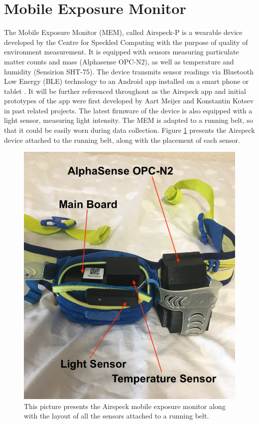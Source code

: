 \documentclass[bsc,frontabs,twoside,singlespacing, parskip,deptreport]{infthesis}     %
\begin{document}
\section{Mobile Exposure Monitor}

The Mobile Exposure Monitor (MEM), called Airspeck-P is a wearable device developed by the Centre for Speckled Computing with the purpose of quality of environment measurement. It is equipped with sensors measuring particulate matter counts and mass (Alphasense OPC-N2), as well as temperature and humidity (Sensirion SHT-75). The device transmits sensor readings via Bluetooth Low Energy (BLE) technology to an Android app installed on a smart phone or tablet \cite{airspeck}. It will be further referenced throughout as the Airspeck app and initial prototypes of the app were first developed by Aart Meijer \cite{Meijer2015} and Konstantin Kotsev \cite{Kotsev2015} in past related projects. The latest firmware of the device is also equipped with a light sensor, measuring light intensity. The MEM is adapted to a running belt, so that it could be easily worn during data collection. Figure \ref{fig:airspeck} presents the Airspeck device attached to the running belt, along with the placement of each sensor.

\begin{figure}[h!]
  \center
  \includegraphics[width=\columnwidth]{airspeck.jpeg} 
  \caption{This picture presents the Airspeck mobile exposure monitor along with the layout of all the sensors attached to a running belt.}
  \label{fig:airspeck}
\end{figure}
\end{document}
